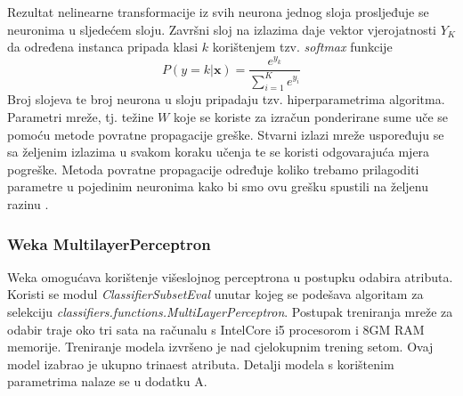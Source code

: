 Rezultat nelinearne transformacije iz svih neurona jednog sloja prosljeđuje se neuronima u sljedećem sloju. Završni sloj na izlazima daje vektor vjerojatnosti $Y_K$ da određena instanca pripada klasi $k$ korištenjem tzv. \textit{softmax} funkcije
\begin{equation}
    P(y=k|\textbf{x}) = \frac{e^{y_k}}{\sum_{i=1}^{K}e^{y_i}}
\end{equation}
Broj slojeva te broj neurona u sloju pripadaju tzv. hiperparametrima algoritma. Parametri mreže, tj. težine $W$ koje se koriste za izračun ponderirane sume uče se pomoću metode povratne propagacije greške. Stvarni izlazi mreže uspoređuju se sa željenim izlazima u svakom koraku učenja te se koristi odgovarajuća mjera pogreške. Metoda povratne propagacije određuje koliko trebamo prilagoditi parametre u pojedinim neuronima kako bi smo ovu grešku spustili na željenu razinu \cite{Goodfellow01}.

\subsubsection*{Weka MultilayerPerceptron}
Weka omogućava korištenje višeslojnog perceptrona u postupku odabira atributa. Koristi se modul \textit{ClassifierSubsetEval} unutar kojeg se podešava algoritam za selekciju \textit{classifiers.functions.MultiLayerPerceptron}. Postupak treniranja mreže za odabir traje oko tri sata na računalu s IntelCore i5 procesorom i 8GM RAM memorije. Treniranje modela izvršeno je nad cjelokupnim trening setom. Ovaj model izabrao je ukupno trinaest atributa. Detalji modela s korištenim parametrima nalaze se u dodatku A.
